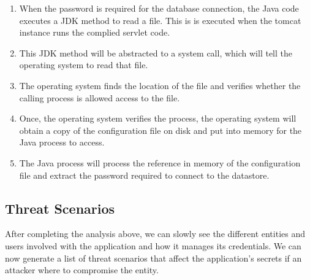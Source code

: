 \documentclass[11pt, a4paper, notitlepage]{article}
\begin{document}
\begin{enumerate}
\item When the password is required for the database connection, the Java code executes a JDK method to read a file. This is is executed when the tomcat instance runs the complied servlet code.
\item This JDK method will be abstracted to a system call, which will tell the operating system to read that file. 
\item The operating system finds the location of the file and verifies whether the calling process is allowed access to the file.
\item Once, the operating system verifies the process, the operating system will obtain a copy of the configuration file on disk and put into memory for the Java process to access.
\item The Java process will process the reference in memory of the configuration file and extract the password required to connect to the datastore.
\end{enumerate}


\subsection*{Threat Scenarios}
After completing the analysis above, we can slowly see the different entities and users involved with the application and how it manages its credentials. We can now generate a list of threat scenarios that affect the application's secrets if an attacker where to compromise the entity. \\
\end{document}
